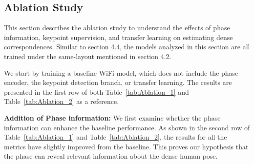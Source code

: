 \documentclass[sigconf, anonymous=false]{acmart}
\begin{document}
\subsection{Ablation Study}
This section describes the ablation study to understand the effects of phase information, keypoint supervision, and transfer learning on estimating dense correspondences. Similar to section 4.4, the models analyzed in this section are all trained under the same-layout mentioned in section 4.2. 

We start by training a baseline WiFi model, which does not include the phase encoder, the keypoint detection branch, or transfer learning. The results are presented in the first row of both Table~\ref{tab:Ablation_1} and Table~\ref{tab:Ablation_2} as a reference. 



{\bf Addition of Phase information:} We first examine whether the phase information can enhance the baseline performance. As shown in the second row of Table~\ref{tab:Ablation_1} and Table~\ref{tab:Ablation_2}, the results for all the metrics have slightly improved from the baseline. This proves our hypothesis that the phase can reveal relevant information about the dense human pose. 

\end{document}
